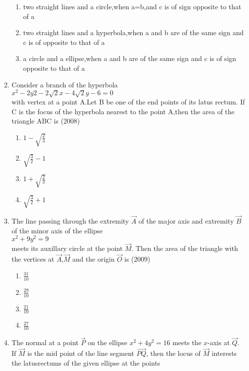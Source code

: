 \begin{enumerate}
\begin{enumerate}
    \item two straight lines and a circle,when a=b,and c is of sign opposite to that of a\\
    \item two straight lines and a hyperbola,when a and b are of the same sign and c is of opposite to that of a\\
    \item a circle and a ellipse,when a and b are of the same sign and c is of sign opposite to that of a\\
\end{enumerate}
\item Consider a branch of the hyperbola\\$x^{2}-2y{2}-2\sqrt{2}x-4\sqrt{2}y-6=0$\\with vertex at a point A.Let B be one of the end points of its latus rectum. If C is the focus of the hyperbola nearest to the point A,then the area of the triangle ABC is \hfill{(2008)}
\begin{multicols}{4}
\begin{enumerate}
    \item $1-\sqrt{\frac{2}{3}}$
    \item $\sqrt{\frac{3}{2}}-1$
    \item $1+\sqrt{\frac{2}{3}}$
    \item $\sqrt{\frac{3}{2}}+1$
\end{enumerate}
\end{multicols}
\item The line passing through the extremity $\vec{A}$ of the major axis and extremity $\vec{B}$ of the minor axis of the ellipse\\$x^{2}+9y^{2}=9$\\meets its auxillary circle at the point $\vec{M}$. Then the area of the triangle with the vertices at $\vec{A}$,$\vec{M}$ and the origin $\vec{O}$ is \hfill{(2009)}
\begin{multicols}{4}
\begin{enumerate}
    \item $\frac{31}{10}$
    \item $\frac{29}{10}$
    \item $\frac{21}{10}$
    \item $\frac{27}{10}$
\end{enumerate}
\end{multicols}
    \item The normal at a point $\vec{P}$ on the ellipse $x^2 +4y^2=16$ meets the $x$-axis at $\vec{Q}$. If $\vec{M}$ is the mid point of the line segment $\vec{PQ}$, then the locus of $\vec{M}$ interests the latusrectums of the given ellipse at the points
	

\end{enumerate}
